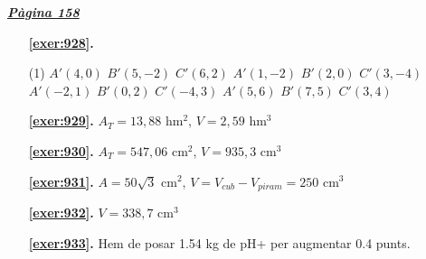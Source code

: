 \hyperlink{page.158}{\textbf{\em Pàgina 158}}
\begin{enumerate}



 \item[\fontfamily{phv}\selectfont\color{blue}\textbf{\ref{exer:928}. }] \label{ans:928}
 \begin{tasks}[column-sep=1em, item-indent=1.3333em](1)
	 \task $A'(4,0)$ $B'(5,-2)$ $C'(6,2)$
	 \task* $A'(1,-2)$ $B'(2,0)$ $C'(3,-4)$
	 \task* $A'(-2,1)$ $B'(0,2)$ $C'(-4,3)$
	 \task $A'(5,6)$ $B'(7,5)$ $C'(3,4)$
\end{tasks}
 \end{enumerate}
\begin{enumerate}
\item[\fontfamily{phv}\selectfont\color{blue}\textbf{\ref{exer:929}. }] \label{ans:929} 
$A_T =13,88$ hm$^{2}$, $V=2,59$ hm$^3$
\item[\fontfamily{phv}\selectfont\color{blue}\textbf{\ref{exer:930}. }] \label{ans:930} 
$A_T =547,06$ cm$^{2}$, $V=935,3$ cm$^3$
\item[\fontfamily{phv}\selectfont\color{blue}\textbf{\ref{exer:931}. }] \label{ans:931} 
$A=50\sqrt {3}$ cm$^{2}$, $V=V_{cub} -V_{piram}=250$ cm$^{3}$
\item[\fontfamily{phv}\selectfont\color{blue}\textbf{\ref{exer:932}. }] \label{ans:932} 
$V=338,7$ cm$^3$
\item[\fontfamily{phv}\selectfont\color{blue}\textbf{\ref{exer:933}. }] \label{ans:933} 
Hem de posar 1.54 kg de pH+ per augmentar 0.4 punts.
 \end{enumerate}